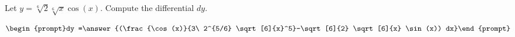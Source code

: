 \documentclass{ximera}
\author{Bart Snapp}
\begin{document}
\begin{exercise}

Let $y= \sqrt[6]{2} \sqrt[6]{x} \cos (x)$. Compute the differential $dy$.

\[
\begin{prompt}dy =\answer{(\frac{\cos (x)}{3\ 2^{5/6} \sqrt[6]{x}^5}-\sqrt[6]{2} \sqrt[6]{x} \sin (x)) dx}\end{prompt}
\]
\end{exercise}
\end{document}
